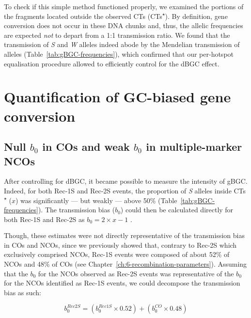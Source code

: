 To check if this simple method functioned properly, we examined the portions of the fragments located outside the observed CTs (CTs\textsuperscript{$\star$}).
By definition, gene conversion does not occur in these DNA chunks and, thus, the allelic frequencies are expected \textit{not} to depart from a 1:1 transmission ratio.
We found that the transmission of \textit{S} and \textit{W} alleles indeed abode by the Mendelian transmission of alleles (Table~\ref{tab:gBGC-frequencies}), which confirmed that our per-hotspot equalisation procedure allowed to efficiently control for the dBGC effect. 





\section{Quantification of GC-biased gene conversion}
\subsection{Null $b_0$ in COs and weak $b_0$ in multiple-marker NCOs}

After controlling for dBGC, it became possible to measure the intensity of gBGC\@.
Indeed, for both Rec-1S and Rec-2S events, the proportion of \textit{S} alleles inside CTs\textsuperscript{$\star$} ($x$) was significantly — but weakly — above 50\% (Table~\ref{tab:gBGC-frequencies}).
The transmission bias ($b_0$) could then be calculated directly for both Rec-1S and Rec-2S as ${b_0 = 2 \times x - 1}$ \citep{nagylaki1983evolution}.

Though, these estimates were not directly representative of the transmission bias in COs and NCOs, since we previously showed that, contrary to Rec-2S which exclusively comprised NCOs, Rec-1S events were composed of about 52\% of NCOs and 48\% of COs (see Chapter~\ref{ch:6-recombination-parameters}). 
Assuming that the $b_0$ for the NCOs observed as Rec-2S events was representative of the $b_0$ for the NCOs identified as Rec-1S events, we could decompose the transmission bias as such: 

\begin{equation*}
	b_0^{Rec2S} = (b_0^{Rec1S} \times 0.52) + (b_0^{CO} \times 0.48)
\end{equation*}

